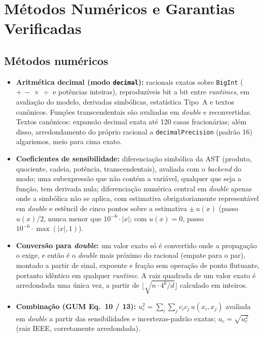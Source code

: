 \documentclass[11pt,a4paper]{article}
\begin{document}
\section{Métodos Numéricos e Garantias Verificadas}
\label{sec:metodos}

\subsection{Métodos numéricos}

\begin{itemize}
  \item \textbf{Aritmética decimal (modo \texttt{decimal}):} racionais exatos sobre \texttt{BigInt} (\(+\,-\,\times\,\div\) e potências inteiras), reproduzíveis bit a bit entre \emph{runtimes}, em avaliação do modelo, derivadas simbólicas, estatística Tipo~A e textos canônicos. Funções transcendentais são avaliadas em \emph{double} e reconvertidas. Textos canônicos: expansão decimal exata até 120 casas fracionárias; além disso, arredondamento do próprio racional a \texttt{decimalPrecision} (padrão 16) algarismos, meio para cima exato.
  \item \textbf{Coeficientes de sensibilidade:} diferenciação simbólica da AST (produto, quociente, cadeia, potência, transcendentais), avaliada com o \emph{backend} do modo; uma subexpressão que não contém a variável, qualquer que seja a função, tem derivada nula; diferenciação numérica central em \emph{double} apenas onde a simbólica não se aplica, com estimativa obrigatoriamente representável em \emph{double} e estêncil de cinco pontos sobre a estimativa \(\pm\, u(x)\) (passo \(u(x)/2\), nunca menor que \(10^{-6} \cdot |x|\); com \(u(x) = 0\), passo \(10^{-6} \cdot \max(|x|, 1)\)).
  \item \textbf{Conversão para \emph{double}:} um valor exato só é convertido onde a propagação o exige, e então é o \emph{double} mais próximo do racional (empate para o par), montado a partir de sinal, expoente e fração sem operação de ponto flutuante, portanto idêntico em qualquer \emph{runtime}. A raiz quadrada de um valor exato é arredondada uma única vez, a partir de \(\lfloor\sqrt{n \cdot 4^k / d}\rfloor\) calculado em inteiros.
  \item \textbf{Combinação (GUM Eq.~10 / 13):} \(u_c^2 = \sum_i \sum_j c_i c_j\, u(x_i, x_j)\) avaliada em \emph{double} a partir das sensibilidades e incertezas-padrão exatas; \(u_c = \sqrt{u_c^2}\) (raiz IEEE, corretamente arredondada).

\end{itemize}
\end{document}
